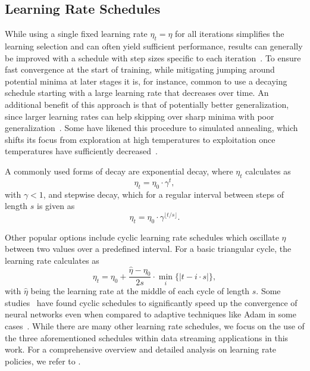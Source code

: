 \documentclass[letterpaper]{article} %
\begin{document}
\subsection{Learning Rate Schedules}

While using a single fixed learning rate $\eta_t = \eta$ for all iterations simplifies the learning selection and can often yield sufficient performance, results can generally be improved with a schedule with step sizes specific to each iteration~\cite{wuDemystifyingLearningRate2019b}. 
To ensure fast convergence at the start of training, while mitigating jumping around potential minima at later stages it is, for instance, common to use a decaying schedule starting with a large learning rate that decreases over time.
An additional benefit of this approach is that of potentially better generalization, since larger learning rates can help skipping over sharp minima with poor generalization~\cite{hochreiterFlatMinima1997,chaudhariEntropySGDBiasingGradient2017}.
Some have likened this procedure to simulated annealing, which shifts its focus from exploration at high temperatures to exploitation once temperatures have sufficiently decreased~\cite{smithDonDecayLearning2018}.

A commonly used forms of decay are exponential decay, where $\eta_{t}$ calculates as
\begin{equation}
	\eta_{t} = \eta_0 \cdot \gamma^t,
\end{equation}
with $\gamma < 1$, and stepwise decay, which for a regular interval between steps of length $s$ is given as
\begin{equation}
	\eta_{t} = \eta_0 \cdot \gamma^{\lfloor t/s \rfloor}.
\end{equation}

Other popular options include cyclic learning rate schedules which oscillate $\eta$ between two values over a predefined interval.
For a basic triangular cycle, the learning rate calculates as
\begin{equation}
	\eta_t = \eta_0 + \frac{\hat{\eta} - \eta_0}{2s} \cdot \min_{i} \{|t-i\cdot s|\},
\end{equation}
with $\hat{\eta}$ being the learning rate at the middle of each cycle of length $s$.
Some studies~\cite{smithCyclicalLearningRates2017, smithSuperConvergenceVeryFast2018a} have found cyclic schedules to significantly speed up the convergence of neural networks even when compared to adaptive techniques like Adam in some cases~\cite{kingmaAdamMethodStochastic2017b}.
While there are many other learning rate schedules, we focus on the use of the three aforementioned schedules within data streaming applications in this work.
For a comprehensive overview and detailed analysis on learning rate policies, we refer to \citet{wuDemystifyingLearningRate2019b}.
\end{document}
